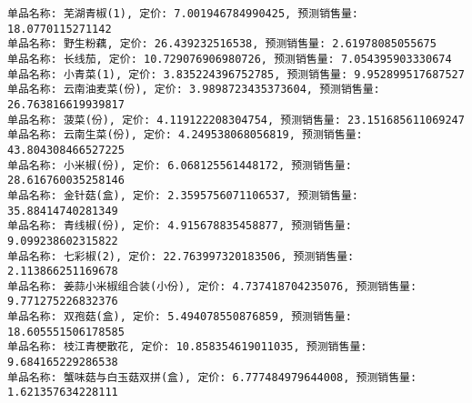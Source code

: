 \documentclass[withoutpreface,bwprint]{cumcmthesis} %
\begin{document}
\begin{lstlisting}[language=text]
单品名称: 芜湖青椒(1), 定价: 7.001946784990425, 预测销售量: 18.0770115271142
单品名称: 野生粉藕, 定价: 26.439232516538, 预测销售量: 2.61978085055675
单品名称: 长线茄, 定价: 10.729076906980726, 预测销售量: 7.054395903330674
单品名称: 小青菜(1), 定价: 3.835224396752785, 预测销售量: 9.952899517687527
单品名称: 云南油麦菜(份), 定价: 3.9898723435373604, 预测销售量: 26.763816619939817
单品名称: 菠菜(份), 定价: 4.119122208304754, 预测销售量: 23.151685611069247
单品名称: 云南生菜(份), 定价: 4.249538068056819, 预测销售量: 43.804308466527225
单品名称: 小米椒(份), 定价: 6.068125561448172, 预测销售量: 28.616760035258146
单品名称: 金针菇(盒), 定价: 2.3595756071106537, 预测销售量: 35.88414740281349
单品名称: 青线椒(份), 定价: 4.915678835458877, 预测销售量: 9.099238602315822
单品名称: 七彩椒(2), 定价: 22.763997320183506, 预测销售量: 2.113866251169678
单品名称: 姜蒜小米椒组合装(小份), 定价: 4.737418704235076, 预测销售量: 9.771275226832376
单品名称: 双孢菇(盒), 定价: 5.494078550876859, 预测销售量: 18.605551506178585
单品名称: 枝江青梗散花, 定价: 10.858354619011035, 预测销售量: 9.684165229286538
单品名称: 蟹味菇与白玉菇双拼(盒), 定价: 6.777484979644008, 预测销售量: 1.621357634228111
 \end{lstlisting}
\end{document}

